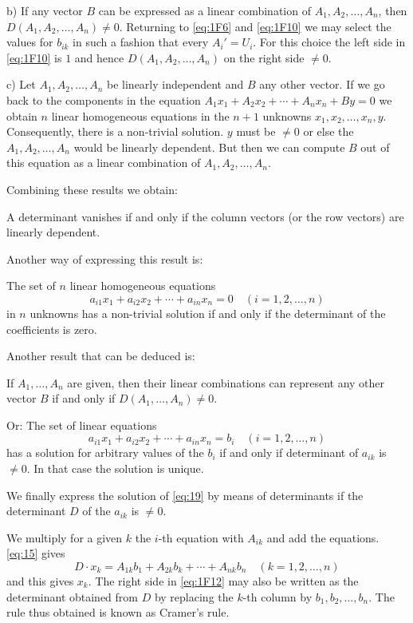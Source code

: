 \documentclass[10pt,leqno,a5paper]{book}
\theoremstyle{definition}
\begin{document}
b) If any vector $B$ can be expressed as a linear combination of $A_1, A_2, \ldots, A_n$, then $D(A_1, A_2, \ldots, A_n) \not= 0$.
Returning to \eqref{eq:1F6} and \eqref{eq:1F10} we may select the values for $b_{ik}$ in such a fashion that every $A_i' = U_i$.
For this choice the left side in \eqref{eq:1F10} is $1$ and hence $D(A_1, A_2, \ldots, A_n)$ on the right side $\not= 0$.

c) Let $A_1, A_2, \ldots, A_n$ be linearly independent and $B$ any other vector.
If we go back to the components in the equation $A_1 x_1 + A_2 x_2 + \cdots + A_n x_n + By = 0$ we obtain $n$ linear homogeneous equations in the $n+1$ unknowns $x_1,x_2,\ldots,x_n,y$.
Consequently, there is a non-trivial solution.
$y$ must be $\not= 0$ or else the $A_1,A_2,\ldots,A_n$ would be linearly dependent.
But then we can compute $B$ out of this equation as a linear combination of $A_1,A_2, \ldots, A_n$.

Combining these results we obtain:

A determinant vanishes if and only if the column vectors (or the row vectors) are linearly dependent.

Another way of expressing this result is:

The set of $n$ linear homogeneous equations
\[
a_{i1} x_1 + a_{i2} x_2 + \cdots + a_{in} x_n = 0
\quad
(i = 1,2,\ldots,n)
\]
in $n$ unknowns has a non-trivial solution if and only if the determinant of the coefficients is zero.

Another result that can be deduced is:

If $A_1, \ldots, A_n$ are given, then their linear combinations can represent any other vector $B$ if and only if $D(A_1,\ldots, A_n) \not= 0$.

Or:
The set of linear equations
\begin{equation}
\label{eq:19}
a_{i1} x_1 + a_{i2} x_2 + \cdots + a_{in} x_n = b_i
\quad
(i = 1,2,\ldots,n)
\end{equation}
has a solution for arbitrary values of the $b_i$ if and only if determinant of $a_{ik}$ is $\not= 0$.
In that case the solution is unique.

We finally express the solution of \eqref{eq:19} by means of determinants if the determinant $D$ of the $a_{ik}$ is $\not= 0$.

We multiply for a given $k$ the $i$-th equation with $A_{ik}$ and add the equations.
\eqref{eq:15} gives
\begin{equation}
\label{eq:20}
D \cdot x_k = A_{1k} b_1 + A_{2k} b_k + \cdots + A_{nk} b_n
\quad
(k = 1,2,\ldots,n)
\end{equation}
and this gives $x_k$.
The right side in \eqref{eq:1F12} may also be written as the determinant obtained from $D$ by replacing the $k$-th column by $b_1,b_2,\ldots,b_n$.
The rule thus obtained is known as Cramer's rule.
\end{document}

